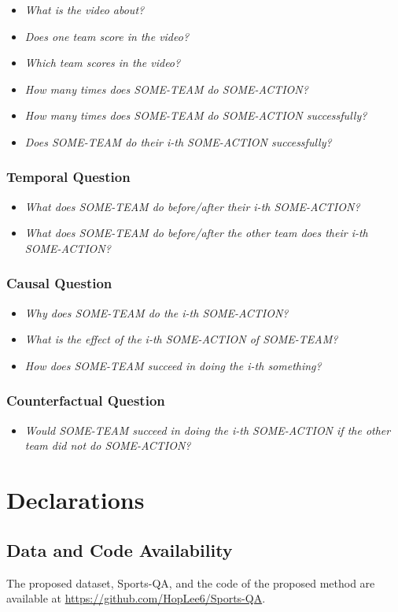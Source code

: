 \begin{itemize}
    \item \textit{What is the video about?}
\item \textit{Does one team score in the video?}
\item \textit{Which team scores in the video?}
\item \textit{How many times does SOME-TEAM do SOME-ACTION?}
\item \textit{How many times does SOME-TEAM do SOME-ACTION successfully?}
\item \textit{Does SOME-TEAM do their i-th SOME-ACTION successfully?}
\end{itemize}

\subsubsection*{Temporal Question}

\begin{itemize}
    \item \textit{What does SOME-TEAM do before/after their i-th SOME-ACTION?}
    \item \textit{What does SOME-TEAM do before/after the other team does their i-th SOME-ACTION?}
\end{itemize}

\subsubsection*{Causal Question}

\begin{itemize}
    \item \textit{Why does SOME-TEAM do the i-th SOME-ACTION?}
    \item \textit{What is the effect of the i-th SOME-ACTION of SOME-TEAM?}
    \item \textit{How does SOME-TEAM succeed in doing the i-th something?}
\end{itemize}

\subsubsection*{Counterfactual Question}

\begin{itemize}
    \item \textit{Would SOME-TEAM succeed in doing the i-th SOME-ACTION if the other team did not do SOME-ACTION?}
\end{itemize}

\section*{Declarations}

\subsection*{Data and Code Availability}
The proposed dataset, Sports-QA, and the code of the proposed method are available at \url{https://github.com/HopLee6/Sports-QA}.

